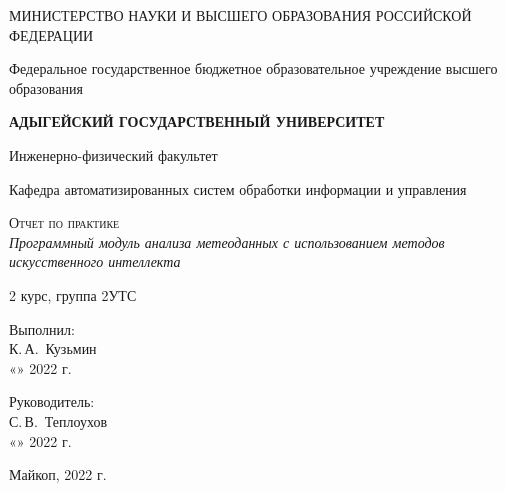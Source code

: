 \documentclass[12pt,a4paper]{scrartcl}
\begin{document}
	\begin{titlepage}
		\begin{center}
			\large
			МИНИСТЕРСТВО НАУКИ И ВЫСШЕГО ОБРАЗОВАНИЯ РОССИЙСКОЙ ФЕДЕРАЦИИ
			
			Федеральное государственное бюджетное образовательное учреждение высшего образования
			
			\textbf{АДЫГЕЙСКИЙ ГОСУДАРСТВЕННЫЙ УНИВЕРСИТЕТ}
			\vspace{0.25cm}
			
			Инженерно-физический факультет
			
			Кафедра автоматизированных систем обработки информации и управления
			\vfill

			\vfill
			
			\textsc{Отчет по практике}\\[5mm]
			
			{\LARGE \textit{Программный модуль анализа метеоданных с использованием методов искусственного интеллекта}}
			\bigskip
			
			2 курс, группа 2УТС
		\end{center}
		\vfill
		
		\newlength{\ML}
		\hfill\begin{minipage}{0.5\textwidth}
			Выполнил:\\
			\underline{\hspace{\ML}} К.\,А.~Кузьмин\\
			«\underline{\hspace{0.7cm}}» \underline{\hspace{2cm}} 2022 г.
		\end{minipage}%
		\bigskip
		
		\hfill\begin{minipage}{0.5\textwidth}
			Руководитель:\\
			\underline{\hspace{\ML}} С.\,В.~Теплоухов\\
			«\underline{\hspace{0.7cm}}» \underline{\hspace{2cm}} 2022 г.
		\end{minipage}%
		\vfill
		
		\begin{center}
			Майкоп, 2022 г.
		\end{center}
	\end{titlepage}
	
\end{document}
